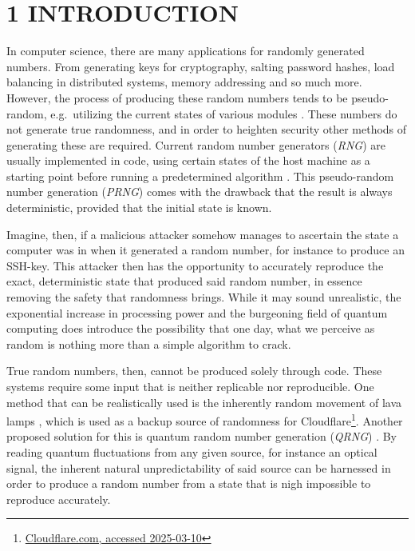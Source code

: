 \section{1 INTRODUCTION}\label{introduction}

In computer science, there are many applications for randomly generated numbers. From generating keys for cryptography, salting password hashes, load balancing in distributed systems, memory addressing and so much more. However, the process of producing these random numbers tends to be pseudo-random, e.g.~utilizing the current states of various modules \cite{randomness}. These numbers do not generate true randomness, and in order to heighten security other methods of generating these are required. Current random number generators (\emph{RNG}) are usually implemented in code, using certain states of the host machine as a starting point before running a predetermined algorithm \cite{randomness}. This pseudo-random number generation (\emph{PRNG}) comes with the drawback that the result is always deterministic, provided that the initial state is known.

Imagine, then, if a malicious attacker somehow manages to ascertain the state a computer was in when it generated a random number, for instance to produce an SSH-key. This attacker then has the opportunity to accurately reproduce the exact, deterministic state that produced said random number, in essence removing the safety that randomness brings. While it may sound unrealistic, the exponential increase in processing power and the burgeoning field of quantum computing does introduce the possibility that one day, what we perceive as random is nothing more than a simple algorithm to crack.

True random numbers, then, cannot be produced solely through code. These systems require some input that is neither replicable nor reproducible. One method that can be realistically used is the inherently random movement of lava lamps \cite{lavarand}, which is used as a backup source of randomness for Cloudflare\footnote{\href{https://blog.cloudflare.com/randomness-101-lavarand-in-production/}{Cloudflare.com, accessed 2025-03-10}}. Another proposed solution for this is quantum random number generation (\emph{QRNG}) \cite{QRNG}. By reading quantum fluctuations from any given source, for instance an optical signal, the inherent natural unpredictability of said source can be harnessed in order to produce a random number from a state that is nigh impossible to reproduce accurately.

